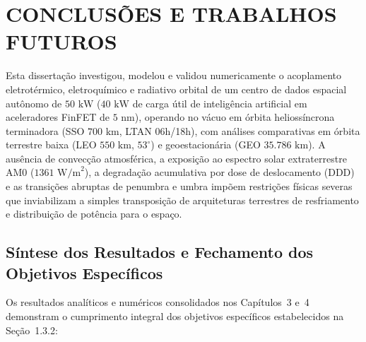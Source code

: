 
\section{CONCLUSÕES E TRABALHOS FUTUROS}
\label{sec:capitulo5_conclusoes}

Esta dissertação investigou, modelou e validou numericamente o acoplamento eletrotérmico, eletroquímico e radiativo orbital de um centro de dados espacial autônomo de $50\text{ kW}$ ($40\text{ kW}$ de carga útil de inteligência artificial em aceleradores FinFET de $5\text{ nm}$), operando no vácuo em órbita heliossíncrona terminadora (SSO $700\text{ km}$, LTAN 06h/18h), com análises comparativas em órbita terrestre baixa (LEO $550\text{ km}$, $53^\circ$) e geoestacionária (GEO $35.786\text{ km}$). A ausência de convecção atmosférica, a exposição ao espectro solar extraterrestre AM0 ($1361\text{ W/m}^2$), a degradação acumulativa por dose de deslocamento (DDD) e as transições abruptas de penumbra e umbra impõem restrições físicas severas que inviabilizam a simples transposição de arquiteturas terrestres de resfriamento e distribuição de potência para o espaço.

\subsection{Síntese dos Resultados e Fechamento dos Objetivos Específicos}
\label{sec:sintese_objetivos_cap5}

Os resultados analíticos e numéricos consolidados nos Capítulos~3 e~4 demonstram o cumprimento integral dos objetivos específicos estabelecidos na Seção~1.3.2:

